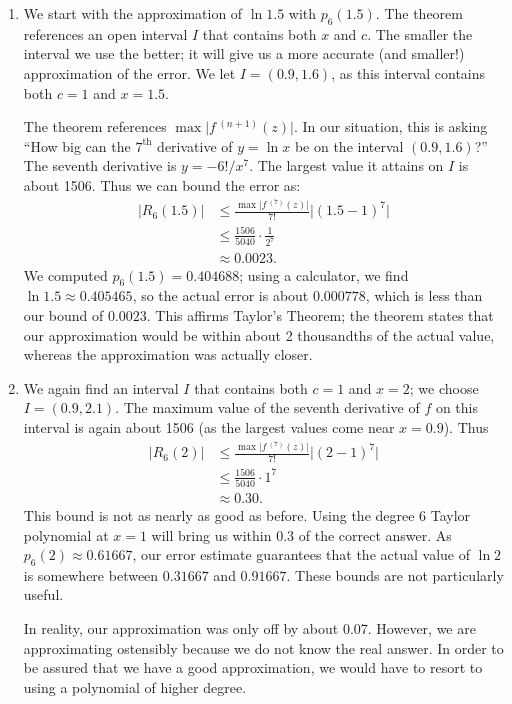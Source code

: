 {\begin{enumerate}
\item	We start with the approximation of $\ln 1.5$ with $p_6(1.5)$. The theorem references an open interval $I$ that contains both $x$ and $c$. The smaller the interval we use the better; it will give us a more accurate (and smaller!) approximation of the error. We let $I = (0.9,1.6)$, as this interval contains both $c=1$ and $x=1.5$. 

The theorem references $\max\big|f\,^{(n+1)}(z)\big|$. In our situation, this is asking ``How big can the $7^\text{th}$ derivative of $y=\ln x$ be on the interval $(0.9,1.6)$?'' The seventh derivative is $y = -6!/x^7$. The largest value it attains on $I$ is about 1506. Thus we can bound the error as:
\begin{align*}
\big|R_6(1.5)\big| &\leq \frac{\max\big|f\,^{(7)}(z)\big|}{7!}\big|(1.5-1)^7\big|\\
					&\leq \frac{1506}{5040}\cdot\frac1{2^7}\\
					&\approx 0.0023.
\end{align*}
We computed $p_6(1.5) = 0.404688$; using a calculator, we find $\ln 1.5 \approx 0.405465$, so the actual error is about $0.000778$, which is less than our bound of $0.0023$. This affirms Taylor's Theorem; the theorem states that our approximation would be within about 2 thousandths of the actual value, whereas the approximation was actually closer.

\item		We again find an interval $I$ that contains both $c=1$ and $x=2$; we choose $I = (0.9,2.1)$. The maximum value of the seventh derivative of $f$ on this interval is again about 1506 (as the largest values come near $x=0.9$). Thus 
\begin{align*}
\big| R_6(2)\big| &\leq \frac{\max\big|f\,^{(7)}(z)\big|}{7!}\big|(2-1)^7\big|\\
					&\leq \frac{1506}{5040}\cdot1^7\\
					&\approx 0.30.
\end{align*}
This bound is not as nearly as good as before. Using the degree 6 Taylor polynomial at $x =1$ will bring us within 0.3 of the correct answer. As $p_6(2)\approx 0.61667$, our error estimate guarantees that the actual value of $\ln 2$ is somewhere between $0.31667$ and $0.91667$. These bounds are not particularly useful.

In reality, our approximation was only off by about 0.07. However, we are approximating ostensibly because we do not know the real answer. In order to be assured that we have a good approximation, we would have to resort to using a polynomial of higher degree.
\end{enumerate}
\baselineskip
}\clearpage%

